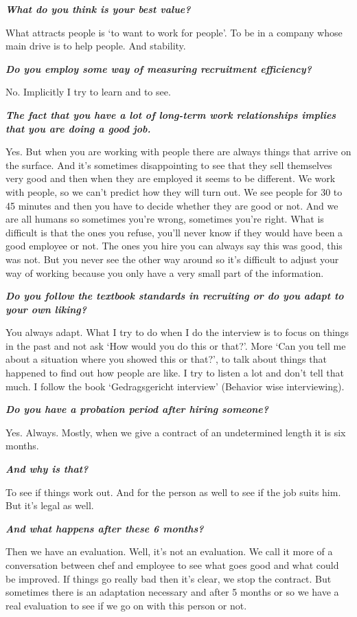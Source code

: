 \documentclass[a4paper,fleqn,11pt,dvips,titlepage]{article}
\newcommand{\question}[1]{\textbf{\textit{#1}}}
\numberwithin{figure}{section}
\numberwithin{equation}{section}
\begin{document}
\question{What do you think is your best value?}

What attracts people is ‘to want to work for people’. To be in a company whose main drive is to help people. And stability. 

\question{Do you employ some way of measuring recruitment efficiency? }

No. Implicitly I try to learn and to see. 

\question{The fact that you have a lot of long-term work relationships implies that you are doing a good job.}

Yes. But when you are working with people there are always things that arrive on the surface. And it’s sometimes disappointing to see that they sell themselves very good and then when they are employed it seems to be different. We work with people, so we can’t predict how they will turn out. We see people for 30 to 45 minutes and then you have to decide whether they are good or not. And we are all humans so sometimes you’re wrong, sometimes you’re right. What is difficult is that the ones you refuse, you’ll never know if they would have been a good employee or not. The ones you hire you can always say this was good, this was not. But you never see the other way around so it’s difficult to adjust your way of working because you only have a very small part of the information. 

\question{Do you follow the textbook standards in recruiting or do you adapt to your own liking? }

You always adapt. What I try to do when I do the interview is to focus on things in the past and not ask ‘How would you do this or that?’. More ‘Can you tell me about a situation where you showed this or that?’, to talk about things that happened to find out how people are like. I try to listen a lot and don’t tell that much. I follow the book ‘Gedragsgericht interview’ (Behavior wise interviewing).

\question{Do you have a probation period after hiring someone? }

Yes. Always. Mostly, when we give a contract of an undetermined length it is six months. 

\question{And why is that?}

To see if things work out. And for the person as well to see if the job suits him. But it’s legal as well. 

\question{And what happens after these 6 months? }

Then we have an evaluation. Well, it’s not an evaluation. We call it more of a conversation between chef and employee to see what goes good and what could be improved. If things go really bad then it’s clear, we stop the contract. But sometimes there is an adaptation necessary and after 5 months or so we have a real evaluation to see if we go on with this person or not. 
\end{document}
